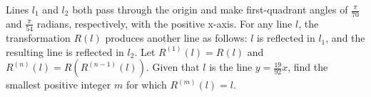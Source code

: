 Lines $l_1$ and $l_2$ both pass through the origin and make first-quadrant angles of $\frac{\pi}{70}$ and $\frac{\pi}{54}$ radians, respectively, with the positive x-axis. For any line $l$, the transformation $R(l)$ produces another line as follows: $l$ is reflected in $l_1$, and the resulting line is reflected in $l_2$. Let $R^{(1)}(l)=R(l)$ and $R^{(n)}(l)=R\left(R^{(n-1)}(l)\right)$. Given that $l$ is the line $y=\frac{19}{92}x$, find the smallest positive integer $m$ for which $R^{(m)}(l)=l$.